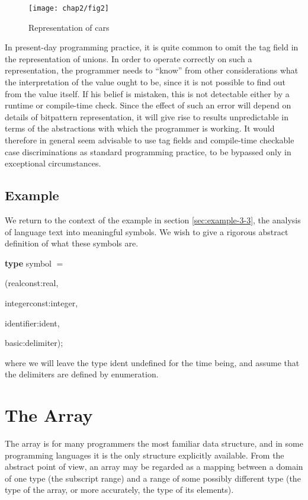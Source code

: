 \begin{figure}[ht!]
	\centering
	\texttt{[image: chap2/fig2]}
	\caption{Representation of cars}
\end{figure}

In present-day programming practice, it is quite common to omit the tag field in the representation of unions. In order to operate correctly on such a representation, the programmer needs to ``know'' from other considerations what the interpretation of the value ought to be, since it is not possible to find out from the value itself. If his belief is mistaken, this is not detectable either by a runtime or compile-time check. Since the effect of such an error will depend on details of bitpattern representation, it will give rise to results unpredictable in terms of the abstractions with which the programmer is working. It would therefore in general seem advisable to use tag fields and compile-time checkable case discriminations as standard programming practice, to be bypassed only in exceptional circumstances.

\subsection{Example}

We return to the context of the example in section \ref{sec:example-3-3}, the analysis of language text into meaningful symbols. We wish to give a rigorous abstract definition of what these symbols are.

\quad \textbf{type} symbol $=$

\tabto*{5.7em}(realconst:real,

\tabto*{6em}integerconst:integer,

\tabto*{6em}identifier:ident,

\tabto*{6em}basic:delimiter);

\noindent
where we will leave the type ident undefined for the time being, and assume that the delimiters are defined by enumeration.

\section[The array]{The Array}
\label{sec:array}

The array is for many programmers the most familiar data structure, and in some programming languages it is the only structure explicitly available. From the abstract point of view, an array may be regarded as a mapping between a domain of one type (the subscript range) and a range of some possibly different type (the type of the array, or more accurately, the type of its elements).

